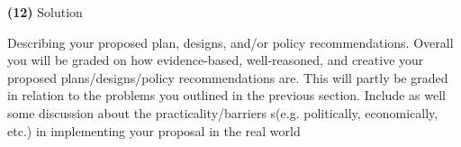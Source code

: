 \documentclass[11pt]{article}
\begin{document}
	\textbf{(12)} Solution 
	
	Describing your proposed plan, designs, and/or policy recommendations. Overall you will be graded on how evidence-based, well-reasoned, and creative your proposed plans/designs/policy recommendations are. This will partly be graded in relation to the problems you outlined in the previous section. Include as well some discussion about the practicality/barriers s(e.g. politically, economically, etc.) in implementing your proposal in the real world
	
	\vspace{5mm}
	
	
	
	
\end{document}
